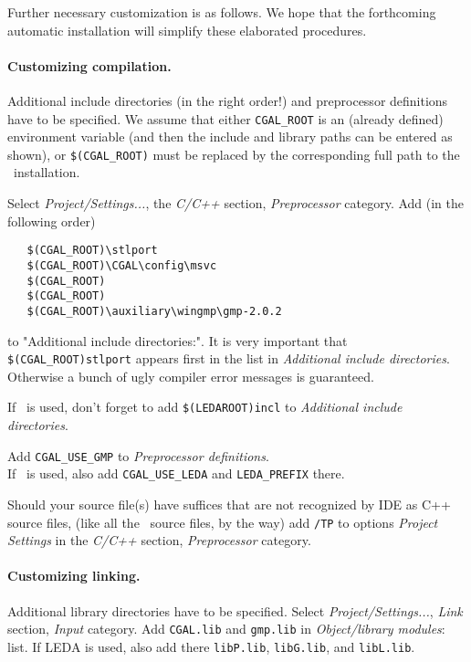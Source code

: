 Further necessary customization is as follows.
We hope that the forthcoming automatic installation will simplify
these elaborated procedures.


\paragraph{Customizing compilation.}
Additional include directories (in the right order!) and preprocessor
definitions have to be specified.  We assume that either 
\texttt{CGAL\_ROOT} is
an (already defined) environment variable (and then the include and
library paths can be entered as shown), or 
\texttt{\$(CGAL\_ROOT)} must be
replaced by the corresponding full path to the \cgal\ installation.

Select {\em Project/Settings...}, the {\em C/C++}
section, {\em Preprocessor} category. Add (in the following order)
\begin{verbatim}
   $(CGAL_ROOT)\stlport
   $(CGAL_ROOT)\CGAL\config\msvc
   $(CGAL_ROOT)
   $(CGAL_ROOT)
   $(CGAL_ROOT)\auxiliary\wingmp\gmp-2.0.2
\end{verbatim}
to "Additional include directories:".
 It is very important that 
\texttt{\$(CGAL\_ROOT)\bslsh stlport} 
appears first in the list in {\em Additional include directories}. 
Otherwise a bunch
of ugly compiler error messages is guaranteed.

If \leda\ is used, don't forget to add 
\texttt{\$(LEDAROOT)\bslsh incl}
to {\em Additional include directories}.

Add \texttt{CGAL\_USE\_GMP} to {\em Preprocessor definitions}.\\
If \leda\ is used, also add \texttt{CGAL\_USE\_LEDA} and
\texttt{LEDA\_PREFIX} there.


Should your source file(s) have suffices that are not recognized by
 IDE as C++ source files,
(like all the \cgal\ source files, by the way)
add \texttt{/TP} to options {\em Project Settings} in the {\em C/C++} section,
{\em Preprocessor} category.


\paragraph{Customizing linking.}
Additional library directories have to be specified.
Select {\em Project/Settings...}, {\em Link} section, {\em Input} 
category. Add 
\texttt{CGAL.lib} and \texttt{gmp.lib}
in {\em Object/library modules}: list.
If LEDA is used, also add there
\texttt{libP.lib},
\texttt{libG.lib}, and 
   \texttt{libL.lib}.

